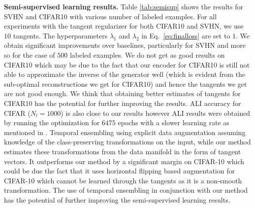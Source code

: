 \documentclass{article}
\begin{document}
{\bf Semi-supervised learning results.}
Table \ref{tab:semisup} shows the results for SVHN and CIFAR10 with various number of labeled examples. For all experiments with the tangent regularizer for both CIFAR10 and SVHN, we use $10$ tangents. The hyperparameters $\lambda_1$ and $\lambda_2$ in Eq.~\eqref{eq:finalloss} are set to $1$. We obtain significant improvements over baselines, particularly for SVHN and more so for the case of $500$ labeled examples. We do not get as good results on CIFAR10 which may be due to the fact that our encoder for CIFAR10 is still not able to approximate the inverse of the generator well (which is evident from the sub-optimal reconstructions we get for CIFAR10) and hence the tangents we get are not good enough. We think that obtaining better estimates of tangents for CIFAR10 has the potential for further improving the results. ALI \cite{dumoulin2016adversarially} accuracy for CIFAR ($N_l=1000$) is also close to  our results however ALI results were obtained by running the optimization for $6475$ epochs with a slower learning rate as mentioned in \cite{dumoulin2016adversarially}. Temporal ensembling \cite{laine2016temporal} using explicit data augmentation assuming knowledge of the class-preserving transformations on the input, while our method estimates these transformations from the data manifold in the form of tangent vectors. It outperforms our method by a significant margin on CIFAR-10 which could be due the fact that it uses horizontal flipping based augmentation for CIFAR-10 which cannot be learned through the tangents as it is a non-smooth transformation. The use of temporal ensembling in conjunction with our method has the potential of further improving the semi-supervised learning results. 
\end{document}
